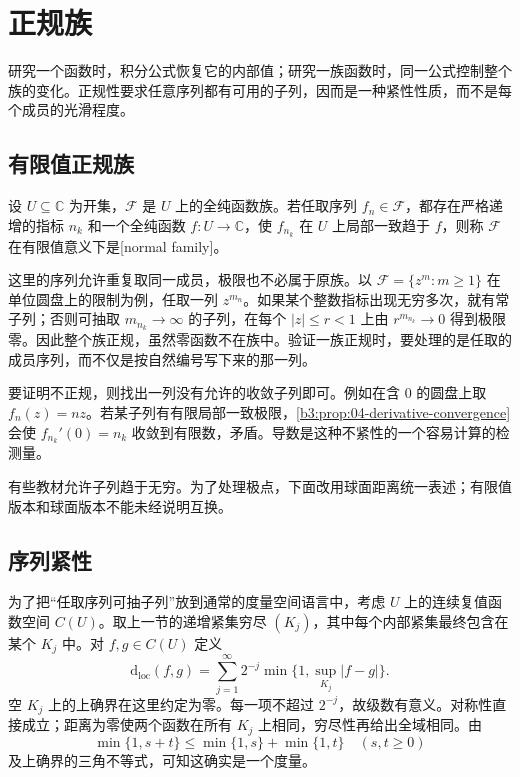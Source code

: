 \section{正规族}
\label{b3:sec:0402}

研究一个函数时，积分公式恢复它的内部值；研究一族函数时，同一公式控制整个族的变化。正规性要求任意序列都有可用的子列，因而是一种紧性性质，而不是每个成员的光滑程度。

\subsection{有限值正规族}
\label{b3:subsec:040201}

\begin{definition}\label{b3:def:04-normal-finite}
设 \(U\subseteq\mathbb C\) 为开集，\(\mathcal F\) 是 \(U\) 上的全纯函数族。若任取序列 \(f_n\in\mathcal F\)，都存在严格递增的指标 \(n_k\) 和一个全纯函数 \(f:U\to\mathbb C\)，使 \(f_{n_k}\) 在 \(U\) 上局部一致趋于 \(f\)，则称 \(\mathcal F\) 在有限值意义下是[normal family]。
\end{definition}
这里的序列允许重复取同一成员，极限也不必属于原族。以 \(\mathcal F=\{z^m:m\ge1\}\) 在单位圆盘上的限制为例，任取一列 \(z^{m_n}\)。如果某个整数指标出现无穷多次，就有常子列；否则可抽取 \(m_{n_k}\to\infty\) 的子列，在每个 \(|z|\le r<1\) 上由 \(r^{m_{n_k}}\to0\) 得到极限零。因此整个族正规，虽然零函数不在族中。验证一族正规时，要处理的是任取的成员序列，而不仅是按自然编号写下来的那一列。

\ProseParagraphBreak

要证明不正规，则找出一列没有允许的收敛子列即可。例如在含 \(0\) 的圆盘上取 \(f_n(z)=nz\)。若某子列有有限局部一致极限，\cref{b3:prop:04-derivative-convergence}会使 \(f_{n_k}'(0)=n_k\) 收敛到有限数，矛盾。导数是这种不紧性的一个容易计算的检测量。

\ProseParagraphBreak

有些教材允许子列趋于无穷。为了处理极点，下面改用球面距离统一表述；有限值版本和球面版本不能未经说明互换。

\subsection{序列紧性}
\label{b3:subsec:040202}

为了把“任取序列可抽子列”放到通常的度量空间语言中，考虑 \(U\) 上的连续复值函数空间 \(C(U)\)。取上一节的递增紧集穷尽 \((K_j)\)，其中每个内部紧集最终包含在某个 \(K_j\) 中。对 \(f,g\in C(U)\) 定义
\[
 \mathrm{d}_{\mathrm{loc}}(f,g)=\sum_{j=1}^{\infty}2^{-j}\min\{1,\sup_{K_j}|f-g|\}.
\]
空 \(K_j\) 上的上确界在这里约定为零。每一项不超过 \(2^{-j}\)，故级数有意义。对称性直接成立；距离为零使两个函数在所有 \(K_j\) 上相同，穷尽性再给出全域相同。由
\[
 \min\{1,s+t\}\le\min\{1,s\}+\min\{1,t\}
 \quad(s,t\ge0)
\]
及上确界的三角不等式，可知这确实是一个度量。

